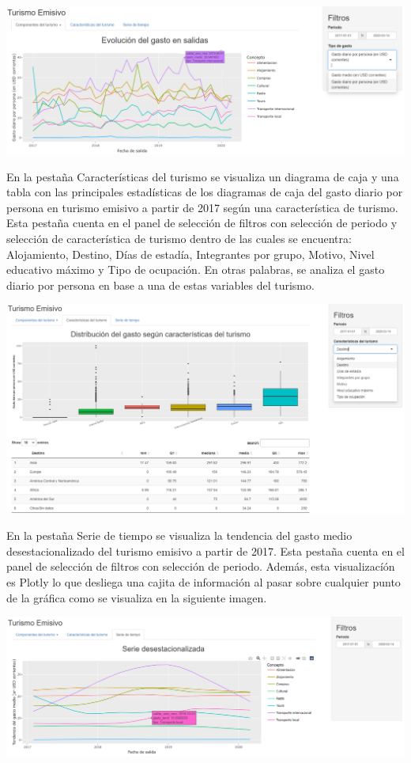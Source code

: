\documentclass[
]{article}
\begin{document}
\includegraphics{Imagenes-shiny/imagen3.png}

En la pestaña Características del turismo se visualiza un diagrama de
caja y una tabla con las principales estadísticas de los diagramas de
caja del gasto diario por persona en turismo emisivo a partir de 2017
según una característica de turismo. Esta pestaña cuenta en el panel de
selección de filtros con selección de periodo y selección de
característica de turismo dentro de las cuales se encuentra:
Alojamiento, Destino, Días de estadía, Integrantes por grupo, Motivo,
Nivel educativo máximo y Tipo de ocupación. En otras palabras, se
analiza el gasto diario por persona en base a una de estas variables del
turismo.

\includegraphics{Imagenes-shiny/imagen4.png}

En la pestaña Serie de tiempo se visualiza la tendencia del gasto medio
desestacionalizado del turismo emisivo a partir de 2017. Esta pestaña
cuenta en el panel de selección de filtros con selección de periodo.
Además, esta visualizacíón es Plotly lo que desliega una cajita de
información al pasar sobre cualquier punto de la gráfica como se
visualiza en la siguiente imagen.

\includegraphics{Imagenes-shiny/imagen5.png}
\end{document}
